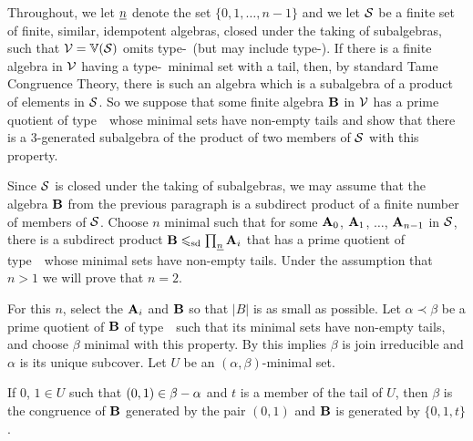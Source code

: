 \medskip

Throughout, we let $\underline{n}$ denote the set $\{0,1,\dots, n-1\}$ and 
we let $\mathcal{S}$ be a finite 
set of finite,
similar, idempotent algebras, closed under the taking of 
subalgebras, such that
$\mathcal{V} = \operatorname{\mathbb{V}}(\mathcal{S})$ omits type-\utyp\ (but may include type-\styp).
If there is a finite algebra in $\mathcal{V}$ having a type-\atyp\ minimal 
set with a tail, then, by standard Tame Congruence Theory, there
is such an algebra which is a subalgebra of a product 
of elements in $\mathcal{S}$. 
So we suppose that some finite algebra
$\mathbf{B}$ in $\mathcal{V}$ has a prime quotient of type~\atyp\ whose 
minimal sets 
have non-empty
tails and show that there is a 3-generated 
subalgebra of the
product of two members of $\mathcal{S}$ with this property.

Since $\mathcal{S}$ is closed under the taking of subalgebras,
we may assume that the algebra $\mathbf{B}$ from the previous paragraph is a subdirect
product of a finite number of members of $\mathcal{S}$. Choose $n$ minimal such that for
some $\mathbf{A}_0$, $\mathbf{A}_1$, $\dots$, $\mathbf{A}_{n-1}$ in $\mathcal{S}$, there is a subdirect
product $\mathbf{B} \leqslant_{\mathrm{sd}} \prod_{\underline{n}} \mathbf{A}_i$
that has a prime quotient of type~\atyp\ whose minimal sets have
non-empty tails.
Under the assumption that $n > 1$ we will prove that $n = 2$.

For this $n$, select the $\mathbf{A}_i$ and $\mathbf{B}$ so that $|B|$ is as small as possible.
Let $\alpha \prec \beta$ be a prime quotient of $\mathbf{B}$ 
of type~\atyp\ such that its minimal sets have
non-empty tails, and choose $\beta$ minimal with this property.
By \cite[Lemma 6.2]{HM:1988} this implies $\beta$ is join 
irreducible and $\alpha$ is its unique subcover.
Let $U$ be an $(\alpha, \beta)$-minimal set. 


\begin{lemma}
\label{lem:fv_3-1}
If\/ $0$, $1 \in U$ such that $(0,1) \in \beta - \alpha$ and
$t$ is a member of the tail of $U$, then $\beta$ is the 
congruence of $\mathbf{B}$
generated by the pair $(0,1)$ and $\mathbf{B}$ is generated 
by $\{0, 1, t\}$.
\end{lemma}

